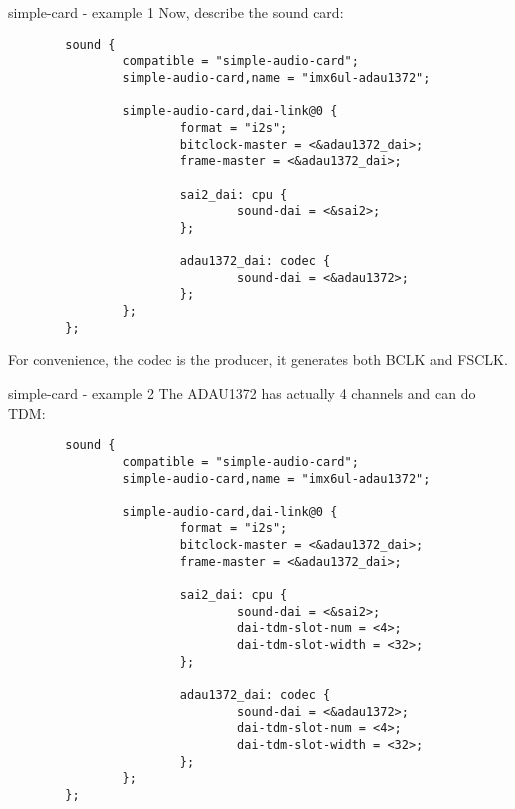 \begin{frame}[fragile]{simple-card - example 1}
  Now, describe the sound card:
  \begin{block}{}
    \fontsize{7}{6}\selectfont
    \begin{verbatim}
        sound {
                compatible = "simple-audio-card";
                simple-audio-card,name = "imx6ul-adau1372";

                simple-audio-card,dai-link@0 {
                        format = "i2s";
                        bitclock-master = <&adau1372_dai>;
                        frame-master = <&adau1372_dai>;

                        sai2_dai: cpu {
                                sound-dai = <&sai2>;
                        };

                        adau1372_dai: codec {
                                sound-dai = <&adau1372>;
                        };
                };
        };
    \end{verbatim}
  \end{block}
  For convenience, the codec is the producer, it generates both BCLK and
  FSCLK.
\end{frame}

\begin{frame}[fragile]{simple-card - example 2}
  The ADAU1372 has actually 4 channels and can do TDM:
  \begin{block}{}
    \fontsize{7}{6}\selectfont
    \begin{verbatim}
        sound {
                compatible = "simple-audio-card";
                simple-audio-card,name = "imx6ul-adau1372";

                simple-audio-card,dai-link@0 {
                        format = "i2s";
                        bitclock-master = <&adau1372_dai>;
                        frame-master = <&adau1372_dai>;

                        sai2_dai: cpu {
                                sound-dai = <&sai2>;
                                dai-tdm-slot-num = <4>;
                                dai-tdm-slot-width = <32>;
                        };

                        adau1372_dai: codec {
                                sound-dai = <&adau1372>;
                                dai-tdm-slot-num = <4>;
                                dai-tdm-slot-width = <32>;
                        };
                };
        };
    \end{verbatim}
  \end{block}
\end{frame}

